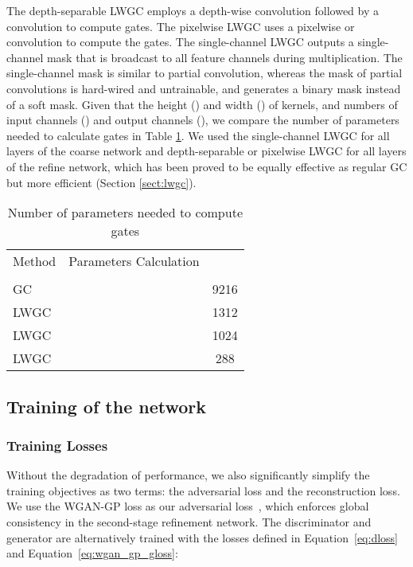 \documentclass[oribibl]{llncs}  \usepackage[width=122mm,left=12mm,paperwidth=146mm,height=193mm,top=12mm,paperheight=217mm]{geometry}
\begin{document}
The depth-separable LWGC employs a depth-wise convolution followed by a  convolution to compute gates. The pixelwise LWGC uses a pixelwise or  convolution to compute the gates. The single-channel LWGC outputs a single-channel mask that is broadcast to all feature channels during multiplication. The single-channel mask is similar to partial convolution, whereas the mask of partial convolutions is hard-wired and untrainable, and generates a binary mask instead of a soft mask. Given that the height () and width () of kernels, and numbers of input channels () and output channels (), we compare the number of parameters needed to calculate gates in Table \ref{table:gc-conv}. We used the single-channel LWGC for all layers of the coarse network and depth-separable or pixelwise LWGC for all layers of the refine network, which has been proved to be equally effective as regular GC but more efficient (Section \ref{sect:lwgc}).

\begin{table}[t]
	\centering
	\caption{Number of parameters needed to compute gates}
	\label{table:gc-conv}
	\small\addtolength{\tabcolsep}{-2pt}
	\begin{tabular}{l||c|c}
	       Method&   Parameters Calculation &    \\
	       &    &    \\
	      \hline
	      \hline
	     GC~\cite{yu2018free}          &   & 9216 \\
	LWGC    &   & 1312 \\
	LWGC  &   &  1024 \\
	LWGC    &   & 288
	\end{tabular}
\end{table}

\subsection{Training of the network}
\subsubsection{Training Losses}
Without the degradation of performance, we also significantly simplify the training objectives as two terms: the adversarial loss and the reconstruction loss. We use the WGAN-GP loss as our adversarial loss~\cite{gulrajani2017improved}, which enforces global consistency in the second-stage refinement network. The discriminator and generator are alternatively trained with the losses defined in Equation~\ref{eq:dloss} and Equation~\ref{eq:wgan_gp_gloss}:
\end{document}
